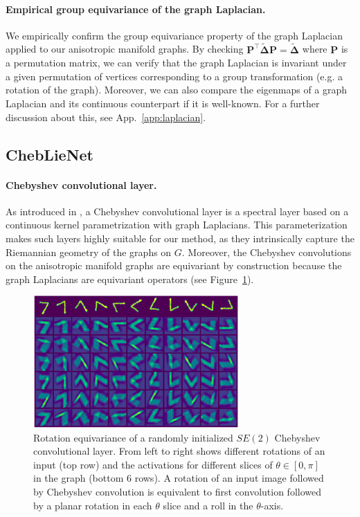 \documentclass{article}
\begin{document}
\paragraph{Empirical group equivariance of the graph Laplacian.} We empirically confirm the group equivariance property of the graph Laplacian applied to our anisotropic manifold graphs. By checking $\boldsymbol{P^\top \tilde{\Delta} P} = \boldsymbol{\tilde{\Delta}}$ where $\boldsymbol{P}$ is a permutation matrix, we can verify that the graph Laplacian is invariant under a given permutation of vertices corresponding to a group transformation (e.g. a rotation of the graph). Moreover, we can also compare the eigenmaps of a graph Laplacian and its continuous counterpart if it is well-known. For a further discussion about this, see App.~\ref{app:laplacian}.


\subsection{ChebLieNet} \label{cheblienet}

\paragraph{Chebyshev convolutional layer.} As introduced in \citet{defferrard2016chebnet}, a Chebyshev convolutional layer is a spectral layer based on a continuous kernel parametrization with graph Laplacians. This parameterization makes such layers highly suitable for our method, as they intrinsically capture the Riemannian geometry of the graphs on $G$. %
Moreover, the Chebyshev convolutions on the anisotropic manifold graphs are equivariant by construction because the graph Laplacians are equivariant operators (see Figure~\ref{fig:7_filters}).


\begin{figure}
    \centering
    \includegraphics[width=0.7\textwidth]{Images/chebconv_filters.png}
    \caption{Rotation equivariance of a randomly initialized $SE(2)$ Chebyshev convolutional layer. From left to right shows different rotations of an input (top row) and the activations for different slices of $\theta \in [0,\pi]$ in the graph (bottom 6 rows). A rotation of an input image followed by Chebyshev convolution is equivalent to first convolution followed by a planar rotation in each $\theta$ slice and a roll in the $\theta$-axis.}
    \label{fig:7_filters}
\end{figure}
\end{document}
